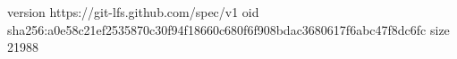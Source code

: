version https://git-lfs.github.com/spec/v1
oid sha256:a0e58c21ef2535870c30f94f18660c680f6f908bdac3680617f6abc47f8dc6fc
size 21988
